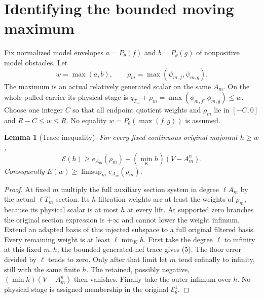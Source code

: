 \documentclass[11pt]{article}
\newtheorem{lemma}[theorem]{Lemma}
\newcommand{\EE}{\mathcal E^1_\theta}
\begin{document}
\section{Identifying the bounded moving maximum}
Fix normalized model envelopes $a=P_\theta(f)$ and $b=P_\theta(g)$
of nonpositive model obstacles. Let
\[
 w=\max(a,b),\qquad
 \rho_m=\max(\psi_{m,f},\psi_{m,g}).
\]
The maximum is an actual relatively generated scalar on the same $A_m$.
On the whole pulled carrier its physical stage is
$q_{T_m}+\rho_m=\max(\phi_{m,f},\phi_{m,g})\leq w$.
Choose one integer $C$ so that all endpoint quotient weights and $\rho_m$
lie in $[-C,0]$ and $R-C\leq w\leq R$.
No equality $w=P_\theta(\max(f,g))$ is assumed.

\begin{lemma}[Trace inequality]\label{trace}
For every fixed continuous original majorant $h\geq w$,
\[
 \mathscr E(h)\geq e_{A_m}(\rho_m)
                    +(\min_Kh)(V-A_m^n).               \tag{5}
\]
Consequently $E(w)\geq\limsup_m e_{A_m}(\rho_m)$.
\end{lemma}
\begin{proof}
At fixed $m$ multiply the full auxiliary section system in degree
$\ell A_m$ by the actual $\ell T_m$ section.
Its $h$ filtration weights are at least the weights of $\rho_m$,
because its physical scalar is at most $h$ at every lift.
At supported zero branches the original section expression is
$+\infty$ and cannot lower the weight infimum.
Extend an adapted basis of this injected subspace to a full
original filtered basis. Every remaining weight is at least
$\ell\min_Kh$. First take the degree $\ell$ to infinity at this
fixed $m,h$; the bounded generated-nef trace gives (5).
The floor error divided by $\ell$ tends to zero.
Only after that limit let $m$ tend cofinally to infinity, still with
the same finite $h$. The retained, possibly negative,
$(\min h)(V-A_m^n)$ then vanishes.
Finally take the outer infimum over $h$. No physical stage is
assigned membership in the original $\EE$.
\end{proof}
\end{document}
